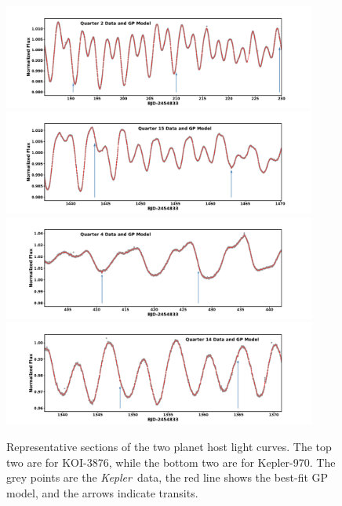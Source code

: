 \documentclass[twocolumn, linenumbers]{aastex631}
\newcommand{\starname}{KOI-3876}
\newcommand{\starnametwo}{Kepler-970}
\newcommand{\kepler}{{\it Kepler}}
\begin{document}
\begin{figure}[tb]
    \centering
    \includegraphics[trim=50 12 50 35,clip=True,width=0.92\textwidth]{q2GP3876.pdf}
    \includegraphics[trim=50 12 50 35,clip=True, width=0.92\textwidth]{q15GP3876.pdf}
    \includegraphics[trim=50 12 50 35,clip=True,width=0.92\textwidth]{q4GP970.pdf}
    \includegraphics[trim=50 12 50 35,clip=True,width=0.92\textwidth]{q14GP970.pdf}
    \caption{Representative sections of the two planet host light curves. The top two are for \starname, while the bottom two are for \starnametwo. The grey points are the \kepler\ data, the red line shows the best-fit GP model, and the arrows indicate transits. }
    \label{fig:quarter2GP}
\end{figure}
\end{document}
